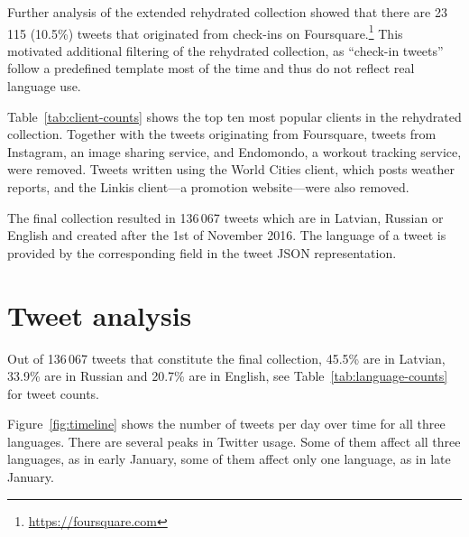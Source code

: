 \documentclass[11pt,a4paper]{article}
\begin{document}

% 

Further analysis of the extended rehydrated collection showed that there are 23\,115 (10.5\%) tweets that originated from check-ins on Foursquare.\footnote{\url{https://foursquare.com}}
This motivated additional filtering of the rehydrated collection, as ``check-in tweets'' follow a predefined template most of the time and thus do not reflect real language use. %



Table~\ref{tab:client-counts} shows the top ten most popular clients in the rehydrated collection. Together with the tweets originating from Foursquare, tweets from Instagram, %
an image sharing service, and Endomondo, %
a workout tracking service, were removed. Tweets written using the World Cities client, which posts weather reports, and the Linkis client---a promotion website---were also removed.

The final collection resulted in 136\,067 tweets which are in Latvian, Russian or English and created after the 1st of November 2016. The language of a tweet is provided by the corresponding field in the tweet JSON representation.

\section{Tweet analysis}
\label{sec:timeline}



Out of 136\,067 tweets that constitute the final collection, 45.5\% are in Latvian, 33.9\% are in Russian and 20.7\% are in English, see Table~\ref{tab:language-counts} for tweet counts.



Figure~\ref{fig:timeline} shows the number of tweets per day over time for all three languages. There are several peaks in Twitter usage. Some of them affect all three languages, as in early January, some of them affect only one language, as in late January.
\end{document}
